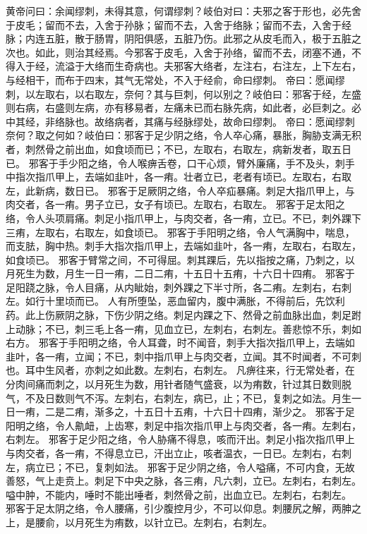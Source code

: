 \documentclass[a4paper,12pt,UTF8,twoside]{ctexbook}
\begin{document}
黄帝问曰：余闻缪刺，未得其意，何谓缪刺？岐伯对曰：夫邪之客于形也，必先舍于皮毛；留而不去，入舍于孙脉；留而不去，入舍于络脉；留而不去，入舍于经脉；内连五脏，散于肠胃，阴阳俱感，五脏乃伤。此邪之从皮毛而入，极于五脏之次也。如此，则治其经焉。今邪客于皮毛，入舍于孙络，留而不去，闭塞不通，不得入于经，流溢于大络而生奇病也。夫邪客大络者，左注右，右注左，上下左右，与经相干，而布于四末，其气无常处，不入于经俞，命曰缪刺。
帝曰：愿闻缪刺，以左取右，以右取左，奈何？其与巨刺，何以别之？岐伯曰：邪客于经，左盛则右病，右盛则左病，亦有移易者，左痛未已而右脉先病，如此者，必巨刺之。必中其经，非络脉也。故络病者，其痛与经脉缪处，故命曰缪刺。
帝曰：愿闻缪刺奈何？取之何如？岐伯曰：邪客于足少阴之络，令人卒心痛，暴胀，胸胁支满无积者，刺然骨之前出血，如食顷而已；不已，左取右，右取左，病新发者，取五日已。
邪客于手少阳之络，令人喉痹舌卷，口干心烦，臂外廉痛，手不及头，刺手中指次指爪甲上，去端如韭叶，各一痏。壮者立已，老者有顷已。左取右，右取左，此新病，数日已。
邪客于足厥阴之络，令人卒疝暴痛。刺足大指爪甲上，与肉交者，各一痏。男子立已，女子有顷已。左取右，右取左。
邪客于足太阳之络，令人头项肩痛。刺足小指爪甲上，与肉交者，各一痏，立已。不已，刺外踝下三痏，左取右，右取左，如食顷已。
邪客于手阳明之络，令人气满胸中，喘息，而支胠，胸中热。刺手大指次指爪甲上，去端如韭叶，各一痏，左取右，右取左，如食顷已。
邪客于臂常之间，不可得屈。刺其踝后，先以指按之痛，乃刺之，以月死生为数，月生一日一痏，二日二痏，十五日十五痏，十六日十四痏。
邪客于足阳跷之脉，令人目痛，从内眦始，刺外踝之下半寸所，各二痏。左刺右，右刺左。如行十里顷而已。
人有所堕坠，恶血留内，腹中满胀，不得前后，先饮利药。此上伤厥阴之脉，下伤少阴之络。刺足内踝之下、然骨之前血脉出血，刺足跗上动脉；不已，刺三毛上各一痏，见血立已，左刺右，右刺左。善悲惊不乐，刺如右方。
邪客于手阳明之络，令人耳聋，时不闻音，刺手大指次指爪甲上，去端如韭叶，各一痏，立闻；不已，刺中指爪甲上与肉交者，立闻。其不时闻者，不可刺也。耳中生风者，亦刺之如此数。左刺右，右刺左。
凡痹往来，行无常处者，在分肉间痛而刺之，以月死生为数，用针者随气盛衰，以为痏数，针过其日数则脱气，不及日数则气不泻。左刺右，右刺左，病已，止；不已，复刺之如法。月生一日一痏，二是二痏，渐多之，十五日十五痏，十六日十四痏，渐少之。
邪客于足阳明之络，令人鼽衄，上齿寒，刺足中指次指爪甲上与肉交者，各一痏。左刺右，右刺左。
邪客于足少阳之络，令人胁痛不得息，咳而汗出。刺足小指次指爪甲上与肉交者，各一痏，不得息立已，汗出立止，咳者温衣，一日已。左刺右，右刺左，病立已；不已，复刺如法。
邪客于足少阴之络，令人嗌痛，不可内食，无故善怒，气上走贲上。刺足下中央之脉，各三痏，凡六刺，立已。左刺右，右刺左。嗌中肿，不能内，唾时不能出唾者，刺然骨之前，出血立已。左刺右，右刺左。
邪客于足太阴之络，令人腰痛，引少腹控月少，不可以仰息。刺腰尻之解，两胂之上，是腰俞，以月死生为痏数，以针立已。左刺右，右刺左。
\end{document}
